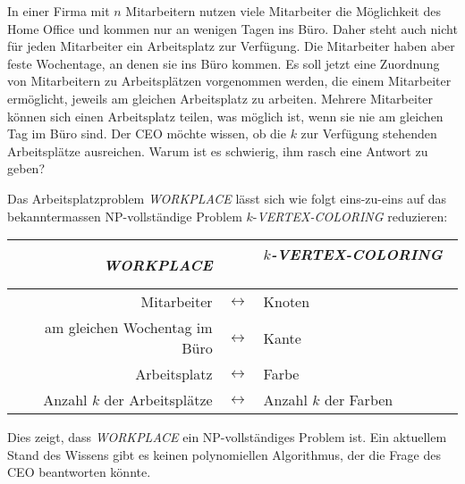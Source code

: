 In einer Firma mit $n$ Mitarbeitern nutzen viele Mitarbeiter die
Möglichkeit des Home Office und kommen nur an wenigen Tagen ins Büro.
Daher steht auch nicht für jeden Mitarbeiter ein Arbeitsplatz zur
Verfügung.
Die Mitarbeiter haben aber feste Wochentage, an denen sie ins Büro
kommen.
Es soll jetzt eine Zuordnung von Mitarbeitern zu Arbeitsplätzen
vorgenommen werden, die einem Mitarbeiter ermöglicht, jeweils am
gleichen Arbeitsplatz zu arbeiten.
Mehrere Mitarbeiter können sich einen Arbeitsplatz teilen, was möglich
ist, wenn sie nie am gleichen Tag im Büro sind.
Der CEO möchte wissen, ob die $k$ zur Verfügung stehenden Arbeitsplätze
ausreichen.
Warum ist es schwierig, ihm rasch eine Antwort zu geben?


\begin{loesung}
Das Arbeitsplatzproblem \textit{WORKPLACE} lässt sich wie folgt eins-zu-eins
auf das bekanntermassen NP-vollständige Problem $k$-\textit{VERTEX-COLORING}
reduzieren:
\begin{center}
\begin{tabular}{r>{$}c<{$}l}
\textit{WORKPLACE} && \textit{$k$-VERTEX-COLORING}  \\
\hline
Mitarbeiter                   &\leftrightarrow& Knoten \\
am gleichen Wochentag im Büro &\leftrightarrow& Kante \\
Arbeitsplatz                  &\leftrightarrow& Farbe \\
Anzahl $k$ der Arbeitsplätze  &\leftrightarrow& Anzahl $k$ der Farben \\
\end{tabular}
\end{center}
Dies zeigt, dass \textit{WORKPLACE} ein NP-vollständiges Problem ist.
Ein aktuellem Stand des Wissens gibt es keinen polynomiellen Algorithmus,
der die Frage des CEO beantworten könnte.
\end{loesung}
